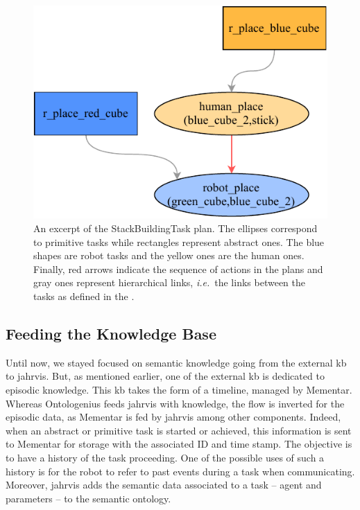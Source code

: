 \documentclass[a4paper,11pt,twoside]{StyleThese}
\begin{document}
\begin{figure}[!ht]
	\centering
	\includegraphics[width=0.5\linewidth]{figures/chapter2/excerpt_plan.pdf}
	\caption{An excerpt of the StackBuildingTask plan. The ellipses correspond to primitive tasks while rectangles represent abstract ones. The blue shapes are robot tasks and the yellow ones are the human ones. Finally, red arrows indicate the sequence of actions in the plans and gray ones represent hierarchical links, \textit{i.e.}~the links between the tasks as defined in the .}
	\label{chap6:fig:excerpt_plan}
\end{figure}

\subsection{Feeding the Knowledge Base}\label{chap6:subsec:feeding}
Until now, we stayed focused on semantic knowledge going from the external \acrshort{kb} to \acrshort{jahrvis}. But, as mentioned earlier, one of the external \acrshort{kb} is dedicated to episodic knowledge. This \acrshort{kb} takes the form of a timeline, managed by Mementar. Whereas Ontologenius feeds \acrshort{jahrvis} with knowledge, the flow is inverted for the episodic data, as Mementar is fed by \acrshort{jahrvis} among other components. Indeed, when an abstract or primitive task is started or achieved, this information is sent to Mementar for storage with the associated ID and time stamp. The objective is to have a history of the task proceeding. One of the possible uses of such a history is for the robot to refer to past events during a task when communicating.
Moreover, \acrshort{jahrvis} adds the semantic data associated to a task -- agent and parameters -- to the semantic ontology. 


\end{document}
